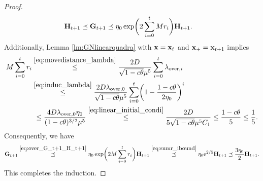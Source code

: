 \documentclass[11pt]{article}
\theoremstyle{plain}
\theoremstyle{definition}
\theoremstyle{remark}
\theoremstyle{plain}
\def\vx{{\bf{x}}}
\def\vx {{{\bf x}}}
\def\F{{\bf F}}
\def\G{{\bf G}}
\def\H{{\bf H}}
\def\x{{\bf x}}
\begin{document}
\begin{proof}
\begin{align}
\label{eq:over_G_t+1_H_t+1}
\H_{t+1}
&\preceq\G_{t+1}
\preceq\eta_0\exp\biggl(2\sum_{i=0}^{t}Mr_i\biggr)\H_{t+1}.
\end{align}
Additionally, Lemma \ref{lm:GNlinearquadra} with $\vx=\vx_t$ and $\vx_+=\vx_{t+1}$ implies
\begin{align}
M\sum_{i=0}^{t}r_i
&\overset{\eqref{eq:movedistance_lambda}}{\leq}
\frac{2D}{\sqrt{1-c\theta}\mu^5}
\sum_{i=0}^{t}\lambda_{\mathrm{over},i}\notag\\
&\overset{\eqref{eq:induc_lambda}}{\leq}
\frac{2D\lambda_{\mathrm{over},0}}{\sqrt{1-c\theta}\mu^5}
\sum_{i=0}^{t}\biggl(1-\frac{1-c\theta}{2\eta_0}\biggr)^i\notag\\
&~\leq\frac{4D\lambda_{\mathrm{over},0}\eta_0}{(1-c\theta)^{3/2}\mu^5}
\overset{\eqref{eq:linear_initial_condi}}{\leq}
\frac{2D}{5\sqrt{1-c\theta}\mu^5C_1}
\leq\frac{1-c\theta}{5}
\leq\frac{1}{5}.
\label{eq:sumr_ibound}
\end{align}
Consequently, we have
\begin{align*}
\G_{t+1}
\overset{\eqref{eq:over_G_t+1_H_t+1}}{\preceq}\eta_0\exp\biggl(2M\sum_{i=0}^{t}r_i\biggr)\H_{t+1}
\overset{\eqref{eq:sumr_ibound}}{\preceq}\eta_0{\rm e}^{2/5}\H_{t+1}
\preceq\frac{3\eta_0}{2}\H_{t+1}.
\end{align*}
This completes the induction. 
\end{proof}
\end{document}
